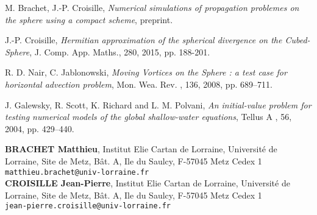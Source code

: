 \documentclass[10pt]{article}
\def\auteurenbasdepage#1#2#3{\small{\bf #1}, \small{#2}\\ \small{\tt #3}\\ }
\begin{document}

\begin{thebibliography}{99}

 {\sc M. Brachet, J.-P. Croisille}, {\sl Numerical simulations of propagation problemes
on the sphere using a compact scheme}, preprint.

 {\sc J.-P. Croisille}, {\sl Hermitian approximation of the spherical divergence on the Cubed-Sphere}, J. Comp. App. Maths., 280, 2015, pp. 188-201.

 {\sc R. D. Nair, C. Jablonowski}, {\sl Moving Vortices on the Sphere : a test case for horizontal advection problem}, Mon. Wea. Rev. , 136, 2008, pp. 689--711.

 {\sc J. Galewsky, R. Scott, K. Richard and L. M. Polvani}, {\sl An initial-value problem for testing numerical models of the global shallow-water equations}, Tellus A , 56, 2004, pp. 429--440.


\end{thebibliography}

\vfill
\auteurenbasdepage{BRACHET Matthieu}{Institut Elie Cartan de Lorraine, Universit\'e de Lorraine,
Site de Metz, B\^at.  A, Ile du Saulcy, F-57045 Metz Cedex 1}{matthieu.brachet@univ-lorraine.fr}
\auteurenbasdepage{CROISILLE Jean-Pierre}{Institut Elie Cartan de Lorraine, Universit\'e de Lorraine,
Site de Metz, B\^at.  A, Ile du Saulcy, F-57045 Metz Cedex 1}{jean-pierre.croisille@univ-lorraine.fr}
\end{document}
